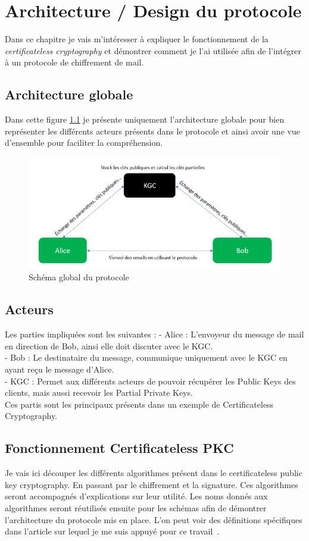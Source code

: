 \chapter{Architecture / Design du protocole}
\label{ch:arch}
Dans ce chapitre je vais m'intéresser à expliquer le fonctionnement de la \textit{certificateless cryptography} et démontrer comment je l'ai utilisée afin de l'intégrer à un protocole de chiffrement de mail.
\section{Architecture globale}
Dans cette figure \ref{fig:globalProtocol} je présente uniquement l'architecture globale pour bien représenter les différents acteurs présents dans le protocole et ainsi avoir une vue d'ensemble pour faciliter la compréhension.
\begin{figure}[h!]
	\centering
	\includegraphics[width=14cm]{images/SchemaGlobal.png}
	\caption{Schéma global du protocole}
	\label{fig:globalProtocol}
\end{figure}
\section{Acteurs}
Les parties impliquées sont les suivantes : 
- Alice : L'envoyeur du message de mail en direction de Bob, ainsi elle doit discuter avec le KGC.\\
- Bob : Le destinataire du message, communique uniquement avec le KGC en ayant reçu le message d'Alice.\\
- KGC : Permet aux différents acteurs de pouvoir récupérer les Public Keys des clients, mais aussi recevoir les Partial Private Keys. \\
Ces partis sont les principaux présents dans un exemple de Certificateless Cryptography.
\section{Fonctionnement Certificateless PKC}
Je vais ici découper les différents algorithmes présent dans le certificateless public key cryptography. En passant par le chiffrement et la signature.
Ces algorithmes seront accompagnés d'explications sur leur utilité. Les noms donnés aux algorithmes seront réutilisés ensuite pour les schémas afin de démontrer l'architecture du protocole mis en place. L'on peut voir des définitions spécifiques dans l'article sur lequel je me suis appuyé pour ce travail~\cite{DBLP:conf/pkc/DentLP08}.
